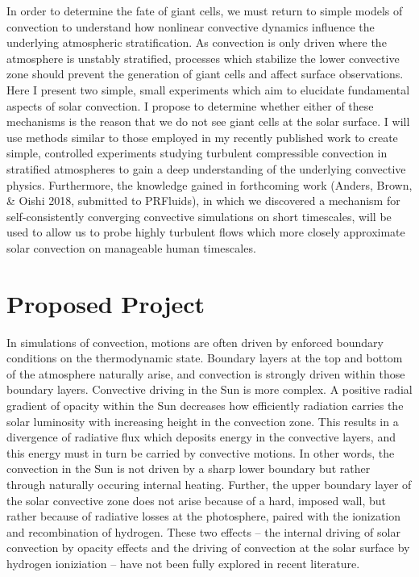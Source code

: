 \documentclass[aasms,12pt]{article}
\begin{document}
In order to determine the fate of giant cells, we must return to simple models of convection to
understand how nonlinear convective dynamics influence the underlying atmospheric stratification.
As convection is only driven where the atmosphere is unstably stratified, processes which stabilize the lower convective
zone should prevent the generation of giant cells and affect surface observations.
Here I present two simple, small experiments which aim to elucidate fundamental aspects of solar
convection. I propose to determine whether either of these mechanisms is the reason that we do not see giant cells
at the solar surface. I will use methods similar to those employed in my recently published work
\citep{anders&brown2017} to create simple, controlled experiments studying turbulent
compressible convection in stratified atmospheres 
to gain a deep understanding of the underlying convective physics.
Furthermore, the knowledge gained in forthcoming work (Anders, Brown, \& Oishi 2018, submitted to PRFluids),
in which we discovered a mechanism for self-consistently converging convective simulations on short timescales,
will be used to allow us to probe highly turbulent flows which more closely approximate solar convection on
manageable human timescales.

\section{Proposed Project}
In simulations of convection, motions are often driven by enforced boundary conditions
on the thermodynamic state.  Boundary layers at the top and bottom of the atmosphere naturally arise,
and convection is strongly driven within those boundary layers.  Convective driving in the Sun is more
complex. A positive radial gradient of opacity within the Sun decreases how efficiently radiation carries
the solar luminosity with increasing height in the convection zone.
This results in a divergence of radiative flux which deposits
energy in the convective layers, and this energy must in turn be carried by convective motions.
In other words, the convection in the Sun is not driven by a sharp lower boundary but rather
through naturally occuring internal heating.
Further, the upper boundary layer of the solar convective zone does not arise because of a hard, imposed wall, 
but rather because of radiative losses at the photosphere, paired with the ionization and 
recombination of hydrogen. These
two effects -- the internal driving of solar convection by opacity effects 
and the driving of convection at the solar surface 
by hydrogen ioniziation -- have not been fully explored in recent literature.
\end{document}
